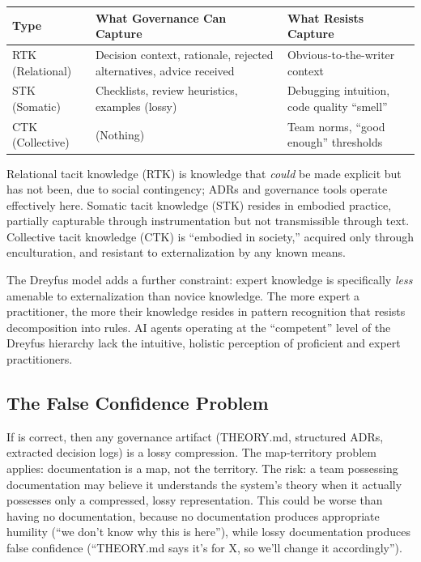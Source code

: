 \begin{center}
\begin{tabular}{lp{5cm}p{5cm}}
\toprule
Type & What Governance Can Capture & What Resists Capture \\
\midrule
RTK (Relational) & Decision context, rationale, rejected alternatives, advice received & Obvious-to-the-writer context \\
STK (Somatic) & Checklists, review heuristics, examples (lossy) & Debugging intuition, code quality ``smell'' \\
CTK (Collective) & (Nothing) & Team norms, ``good enough'' thresholds \\
\bottomrule
\end{tabular}
\end{center}

Relational tacit knowledge (RTK) is knowledge that \emph{could} be made explicit but has not been, due to social contingency; ADRs and governance tools operate effectively here. Somatic tacit knowledge (STK) resides in embodied practice, partially capturable through instrumentation but not transmissible through text. Collective tacit knowledge (CTK) is ``embodied in society,'' acquired only through enculturation, and resistant to externalization by any known means.

The Dreyfus model adds a further constraint: expert knowledge is specifically \emph{less} amenable to externalization than novice knowledge. The more expert a practitioner, the more their knowledge resides in pattern recognition that resists decomposition into rules. AI agents operating at the ``competent'' level of the Dreyfus hierarchy lack the intuitive, holistic perception of proficient and expert practitioners.

\subsection{The False Confidence Problem}

If \citet{naur1985} is correct, then any governance artifact (THEORY.md, structured ADRs, extracted decision logs) is a lossy compression. The map-territory problem applies: documentation is a map, not the territory. The risk: a team possessing documentation may believe it understands the system's theory when it actually possesses only a compressed, lossy representation. This could be worse than having no documentation, because no documentation produces appropriate humility (``we don't know why this is here''), while lossy documentation produces false confidence (``THEORY.md says it's for X, so we'll change it accordingly'').

